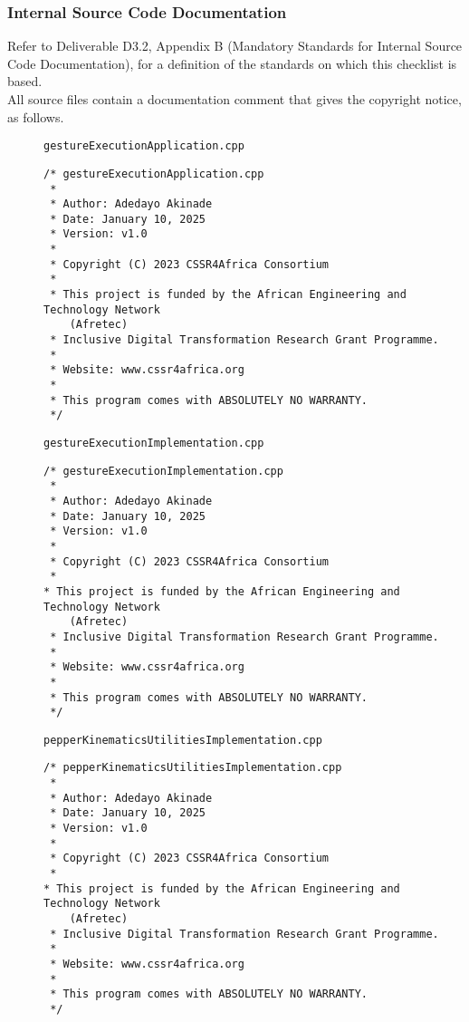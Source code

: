 \documentclass{CSSRforAfrica}
\newcommand{\checkboxChecked}{\fbox{\ding{51}}} %
\begin{document}
 
 
\subsubsection{Internal Source Code Documentation}
\label{subsubsection:gesture_execution_documentation_standards}  
 
Refer to Deliverable D3.2, Appendix B (Mandatory Standards for Internal Source Code Documentation), for a definition of the standards on which this checklist is based.\\

\noindent All source files contain a documentation comment that gives the copyright notice, as follows.
 
\begin{description}

\item[\checkboxChecked] {\small \verb+gestureExecutionApplication.cpp+}  
{\small \begin{verbatim}
/* gestureExecutionApplication.cpp
 *
 * Author: Adedayo Akinade
 * Date: January 10, 2025
 * Version: v1.0
 * 
 * Copyright (C) 2023 CSSR4Africa Consortium
 * 
 * This project is funded by the African Engineering and Technology Network 
    (Afretec) 
 * Inclusive Digital Transformation Research Grant Programme. 
 *
 * Website: www.cssr4africa.org
 *
 * This program comes with ABSOLUTELY NO WARRANTY.
 */
\end{verbatim} }

\newpage
\item[\checkboxChecked]  {\small \verb+gestureExecutionImplementation.cpp+}  
{\small \begin{verbatim}
/* gestureExecutionImplementation.cpp
 *
 * Author: Adedayo Akinade
 * Date: January 10, 2025
 * Version: v1.0
 * 
 * Copyright (C) 2023 CSSR4Africa Consortium
 * 
* This project is funded by the African Engineering and Technology Network 
    (Afretec) 
 * Inclusive Digital Transformation Research Grant Programme. 
 *
 * Website: www.cssr4africa.org
 *
 * This program comes with ABSOLUTELY NO WARRANTY.
 */
\end{verbatim} }

\item[\checkboxChecked]  {\small \verb+pepperKinematicsUtilitiesImplementation.cpp+}  
{\small \begin{verbatim}
/* pepperKinematicsUtilitiesImplementation.cpp
 *
 * Author: Adedayo Akinade
 * Date: January 10, 2025
 * Version: v1.0
 * 
 * Copyright (C) 2023 CSSR4Africa Consortium
 * 
* This project is funded by the African Engineering and Technology Network 
    (Afretec) 
 * Inclusive Digital Transformation Research Grant Programme. 
 *
 * Website: www.cssr4africa.org
 *
 * This program comes with ABSOLUTELY NO WARRANTY.
 */
\end{verbatim} }


\end{description}
\end{document}
